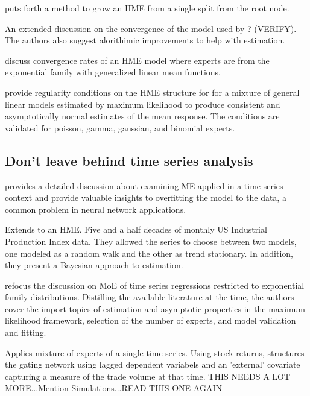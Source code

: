 \documentclass[12pt]{article}
\begin{document}
\cite{WaterhouseRobinson1995} puts forth a method to grow an HME from a 
single split from the root node.

\cite{JordanXuConverge1995} An extended discussion on the convergence of the
model used by \cite{JordanJacobs1993} ? (VERIFY). The authors also suggest
alorithimic improvements to help with estimation.

\cite{JiangTanner1999} discuss convergence rates of an HME model where experts
are from the exponential family with generalized linear mean functions.

\cite{JiangTanner2000} provide regularity conditions on the HME structure for
for a mixture of general linear models estimated by maximum likelihood to
produce consistent and asymptotically normal estimates of the mean response.
The conditions are validated for poisson, gamma, gaussian, and binomial experts.



\subsection{Don't leave behind time series analysis}

\cite{WMS1995} provides a detailed discussion about examining ME applied in
a time series context and provide valuable insights to overfitting the model
to the data, a common problem in neural network applications.

\cite{HuertaJiangTanner2003} Extends \cite{WMS1995} to an HME.
Five and a half decades of monthly US Industrial Production
Index data. They allowed the series to choose between two models, one modeled
as a random walk and the other as trend stationary. In addition, they present a
Bayesian approach to estimation.

\cite{CarvalhoTanner2006} refocus the discussion on MoE of time series
regressions restricted to exponential family distributions. Distilling
the available literature at the time, the authors cover the import topics of
estimation and asymptotic properties in the maximum likelihood
framework, selection of the number of experts, and model validation and
fitting.

\cite{CarvalhoSkoulakis2010} Applies mixture-of-experts of a single time series.
Using stock returns, structures the gating network using lagged dependent
variabels and an 'external' covariate capturing a measure of the trade
volume at that time. THIS NEEDS A LOT MORE...Mention Simulations...READ 
THIS ONE AGAIN
\end{document}
